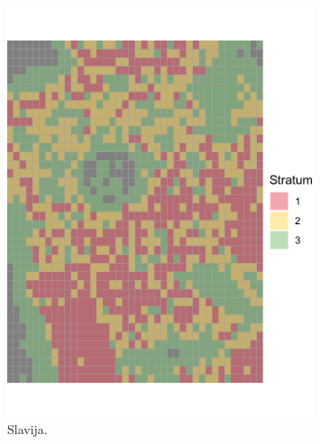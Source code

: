 \documentclass[a4paper,12pt]{article}
\begin{document}
\begin{figure}[H] 
	\centering 
	\includegraphics[width=0.8\textwidth]{../outputs/grid_output/strata_viz/slavija-centar_strata.png} 
	\caption{Slavija.} 
	\label{fig:slavija} 
\end{figure}
\end{document}
